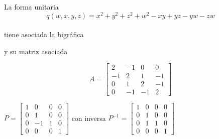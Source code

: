 \begin{example}\citep{AbarcaSoteloMarioAlberto2011Apds}
La forma unitaria
\begin{equation}
    q(w, x, y, z) = x^{2} + y^{2} + z^{2} + w^{2} - xy + yz - yw - zw
    \label{ecuacion:1.5}
\end{equation}\\

tiene asociada la bigráfica\\

\begin{center}
\end{center}

y su matriz asociada\\

\begin{center}
\begin{equation*}
    A = \begin{bmatrix}
    2 & -1  &  0 &  0\\
   -1 &  2  &  1 & -1\\
    0 &  1  &  2 & -1 \\
    0 & -1  & -1 &  2
    \end{bmatrix}
\end{equation*}
\end{center}

$P = \begin{bmatrix}
   1 &  0  & 0 & 0\\
   0 &  1  & 0 & 0\\
   0 & -1  & 1 & 0 \\
   0 &  0  & 0 & 1
      \end{bmatrix}$ con inversa  $P^{-1} =  \begin{bmatrix}
   1 &  0  & 0 & 0\\
   0 &  1  & 0 & 0\\
   0 &  1  & 1 & 0 \\
   0 &  0  & 0 & 1
           \end{bmatrix}$
           

\end{example}
